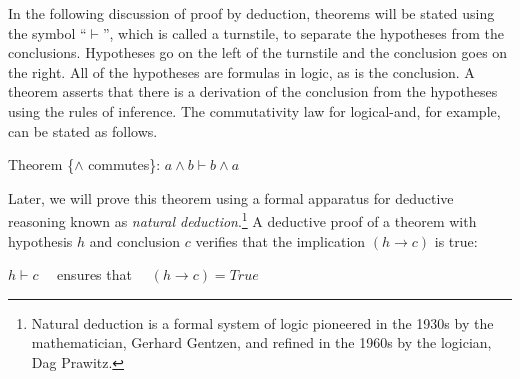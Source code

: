 In the following discussion of proof by deduction,
theorems will be stated using the symbol ``$\vdash$'',
which is called a turnstile,
to separate the hypotheses from the conclusions.
Hypotheses go on the left of the turnstile and the conclusion goes on the right.
All of the hypotheses are formulas in logic, as is the conclusion.
A theorem asserts that there is a derivation of the conclusion
from the hypotheses using the rules of inference.
The commutativity law for logical-and, for example,
can be stated as follows.
\begin{center}
Theorem \{$\wedge$ commutes\}: $a \wedge b \vdash b \wedge a$
\end{center}

Later, we will prove this theorem using a formal apparatus
for deductive reasoning known as
\emph{natural deduction}.\footnote{Natural
deduction is a formal system of logic pioneered in the 1930s
by the mathematician, Gerhard Gentzen, and refined in the 1960s
by the logician, Dag Prawitz.}
A deductive proof of a theorem with hypothesis $h$ and conclusion $c$
verifies that the implication $(h \rightarrow c)$ is true:
\begin{center}
$h \vdash c$ ~~ensures that~~ $(h \rightarrow c) = True$
\end{center}

